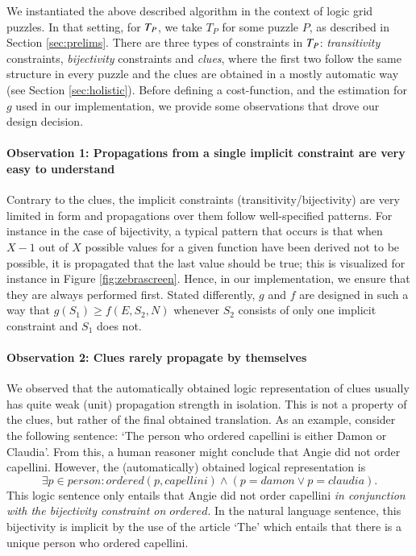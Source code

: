 
We instantiated the above described algorithm in the context of logic grid puzzles. 
In that setting, for $T_P$, we take $T_P$ for some puzzle $P$, as described in Section \ref{sec:prelims}. 
There are three types of constraints in $T_P$: \emph{transitivity} constraints, \emph{bijectivity} constraints and \emph{clues}, where the first two follow the same structure in every puzzle and the clues are obtained in a mostly automatic way (see Section \ref{sec:holistic}). 
Before defining a cost-function, and the estimation for $g$ used in our implementation, we provide some observations that drove our design decision. 

\paragraph{Observation 1: Propagations from a single implicit constraint are very easy to understand}\label{obs:1:implicitconstraints} Contrary to the clues, the implicit constraints (transitivity/bijectivity) are very limited in form and propagations over them follow well-specified patterns. 
For instance in the case of bijectivity, a typical pattern that occurs is that when $X-1$ out of $X$ possible values for a given function have been derived not to be possible, it is propagated that the last value should be true; this is visualized for instance in Figure \ref{fig:zebrascreen}. 
Hence, in our implementation, we ensure that they are always performed first. Stated differently, $g$ and $f$ are designed in such a way that $g(S_1)\geq f(E,S_2,N)$  whenever $S_2$ consists of only one implicit constraint and $S_1$ does not. 

\paragraph{Observation 2: Clues rarely propagate by themselves}\label{obs:2:cluespropagate}
We observed that the automatically obtained logic representation of clues usually has quite weak (unit) propagation strength in isolation. 
This is not a property of the clues, but rather of the final obtained translation. As an example, consider the following sentence: 
`The person who ordered capellini is either Damon or Claudia'. From this, a human reasoner might conclude that Angie did not order capellini. 
However, the (automatically) obtained logical representation is 
\[ \exists p \in person: ordered(p, capellini)\land (p = damon \lor p =  claudia).\]
This logic sentence only entails that Angie did not order capellini \emph{in conjunction with the bijectivity constraint on $ \mathit{ordered}$}.
In the natural language sentence, this bijectivity is implicit by the use of the article `The' which entails that there is a unique person who ordered capellini. 

